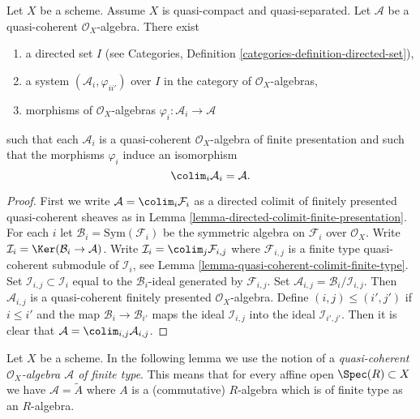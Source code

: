 \begin{lemma}
\label{lemma-algebra-directed-colimit-finite-presentation}
Let $X$ be a scheme. Assume $X$ is quasi-compact and quasi-separated.
Let $\mathcal{A}$ be a quasi-coherent $\mathcal{O}_X$-algebra.
There exist
\begin{enumerate}
\item a directed set $I$ (see
Categories, Definition \ref{categories-definition-directed-set}),
\item a system $(\mathcal{A}_i, \varphi_{ii'})$
over $I$ in the category of $\mathcal{O}_X$-algebras,
\item morphisms of $\mathcal{O}_X$-algebras
$\varphi_i : \mathcal{A}_i \to \mathcal{A}$
\end{enumerate}
such that each $\mathcal{A}_i$ is a quasi-coherent $\mathcal{O}_X$-algebra
of finite presentation and such that the morphisms $\varphi_i$
induce an isomorphism
$$
\colim_i \mathcal{A}_i
=
\mathcal{A}.
$$
\end{lemma}

\begin{proof}
First we write $\mathcal{A} = \colim_i \mathcal{F}_i$ as a directed
colimit of finitely presented quasi-coherent sheaves as in
Lemma \ref{lemma-directed-colimit-finite-presentation}.
For each $i$ let $\mathcal{B}_i = \text{Sym}(\mathcal{F}_i)$ be the
symmetric algebra on $\mathcal{F}_i$ over $\mathcal{O}_X$. Write
$\mathcal{I}_i = \Ker(\mathcal{B}_i \to \mathcal{A})$. Write
$\mathcal{I}_i = \colim_j \mathcal{F}_{i, j}$ where
$\mathcal{F}_{i, j}$ is a finite type quasi-coherent submodule of
$\mathcal{I}_i$, see
Lemma \ref{lemma-quasi-coherent-colimit-finite-type}.
Set $\mathcal{I}_{i, j} \subset \mathcal{I}_i$
equal to the $\mathcal{B}_i$-ideal generated by $\mathcal{F}_{i, j}$.
Set $\mathcal{A}_{i, j} = \mathcal{B}_i/\mathcal{I}_{i, j}$.
Then $\mathcal{A}_{i, j}$ is a quasi-coherent finitely presented
$\mathcal{O}_X$-algebra. Define $(i, j) \leq (i', j')$ if
$i \leq i'$ and the map $\mathcal{B}_i \to \mathcal{B}_{i'}$
maps the ideal $\mathcal{I}_{i, j}$ into the ideal $\mathcal{I}_{i', j'}$.
Then it is clear that $\mathcal{A} = \colim_{i, j} \mathcal{A}_{i, j}$.
\end{proof}

\noindent
Let $X$ be a scheme. In the following lemma we use the notion
of a {\it quasi-coherent $\mathcal{O}_X$-algebra $\mathcal{A}$
of finite type}. This means that for every affine open
$\Spec(R) \subset X$ we have $\mathcal{A} = \widetilde{A}$
where $A$ is a (commutative) $R$-algebra which is of finite type
as an $R$-algebra.

